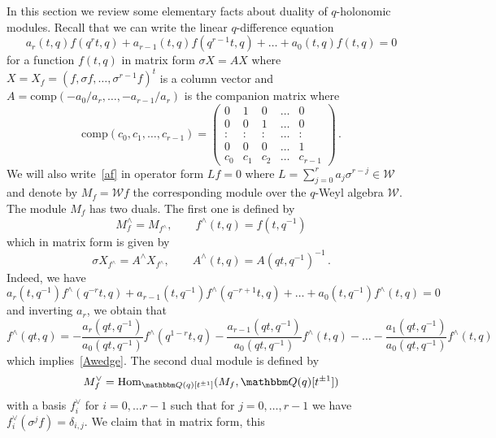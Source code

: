 \documentclass[12pt,reqno]{amsart}
\theoremstyle{definition}
\def\BQ{\mathbbm Q}
\def\calW{\mathcal W}
\def\s{\sigma}
\def\be{\begin{equation}}
\def\ee{\end{equation}}
\def\comp{\mathrm{comp}}
\begin{document}
In this section we review some elementary facts about duality of $q$-holonomic modules.
Recall that we can write the linear $q$-difference equation
\be
\label{af}
a_r(t,q) f(q^r t, q) + a_{r-1}(t,q) f(q^{r-1}t,q) + \dots + a_0(t,q) f(t,q) =0 
\ee
for a function $f(t,q)$ in matrix form $\s X = A X$ where
$X=X_f=(f, \s f, \dots, \s^{r-1} f)^t$ is a column vector and
$A=\comp(-a_0/a_r, \dots, -a_{r-1}/a_r)$ is the companion matrix where
{\small
\be
\label{comp}
\comp(c_0,c_1,\dots,c_{r-1}) =
\begin{pmatrix}
0 & 1 & 0 & \dots & 0\\
0 & 0 & 1 & \dots & 0\\
: & : & : & \dots & :\\
0 & 0 & 0 & \dots & 1\\
c_0 & c_1 & c_2 & \dots
& c_{r-1} 
\end{pmatrix} \,.
\ee
}
We will also write~\eqref{af} in operator form $L f=0$ where
$L=\sum_{j=0}^r a_j \s^{r-j} \in \calW$ and denote by $M_f=\calW f$ the corresponding
module over the $q$-Weyl algebra $\calW$. The module $M_f$ has two duals.
The first one is defined by
\be
\label{Mdual1}
M_{f}^{\wedge}=M_{f^{\wedge}}, \qquad f^{\wedge}(t,q)=f(t,q^{-1}) 
\ee
which in matrix form is given by
\be
\label{Awedge}
\s X_{f^{\wedge}} = A^{\wedge} X_{f^{\wedge}}, \qquad
A^{\wedge}(t,q) = A(qt,q^{-1})^{-1} \,.
\ee
Indeed, we have
\begin{equation*}
a_r(t,q^{-1}) f^{\wedge}(q^{-r} t, q) + a_{r-1}(t,q^{-1})
f^{\wedge}(q^{-r+1}t,q) + \dots + a_0(t,q^{-1}) f^{\wedge}(t,q) =0 
\end{equation*}
and inverting $a_{r}$, we obtain that
\begin{equation*}
f^{\wedge}(qt,q)
=
-\frac{ a_{r}(qt,q^{-1})}{ a_{0}(qt,q^{-1})}f^{\wedge}(q^{1-r}t,q)
- \frac{ a_{r-1}(qt,q^{-1})}{ a_{0}(qt,q^{-1})}f^{\wedge}(t,q)
-\dots
-\frac{ a_{1}(qt,q^{-1})}{ a_{0}(qt,q^{-1})}f^{\wedge}(t,q)
\end{equation*}
which implies~\eqref{Awedge}. The second dual module is defined by
\be
\label{Mdual2}
M_{f}^{\vee}
=
\mathrm{Hom}_{\BQ(q)[t^{\pm 1}]}(M_{f},\BQ(q)[t^{\pm 1}]) 
\ee
with a basis $f^{\vee}_{i}$ for $i=0,\dots r-1$ such that for $j=0,\dots,r-1$ we have
$f^{\vee}_{i}(\sigma^{j}f)=\delta_{i,j}$. We claim that in matrix form, this
\end{document}
